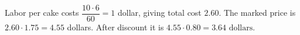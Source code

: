 Labor per cake costs $\dfrac{10\cdot6}{60}=1$ dollar, giving total cost $2.60$. The marked price is $2.60\cdot1.75=4.55$ dollars. After discount it is $4.55\cdot0.80=\boxed{3.64\text{ dollars}}$.
